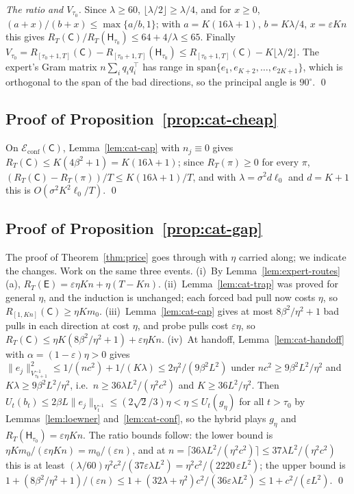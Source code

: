 \documentclass{article}
\theoremstyle{definition}
\theoremstyle{remark}
\newcommand{\eps}{\varepsilon}
\theoremstyle{remark}
\newcommand{\Cold}{\mathsf{C}}
\newcommand{\Exp}{\mathsf{E}}
\newcommand{\Hyb}{\mathsf{H}}
\begin{document}
\emph{The ratio and $V_{\tau_0}$.} Since $\lambda\ge60$, $\lfloor\lambda/2\rfloor\ge\lambda/4$,
and for $x\ge0$, $(a+x)/(b+x)\le\max\{a/b,1\}$; with $a=K(16\lambda+1)$,
$b=K\lambda/4$, $x=\eps Kn$ this gives $R_T(\Cold)/R_T(\Hyb_{\tau_0})\le64+4/\lambda\le65$.
Finally $V_{\tau_0}=R_{[\tau_0+1,T]}(\Cold)-R_{[\tau_0+1,T]}(\Hyb_{\tau_0})\le R_{[\tau_0+1,T]}(\Cold)-K\lfloor\lambda/2\rfloor$.
The expert's Gram matrix $n\sum_iq_iq_i^\top$ has range in
$\mathrm{span}\{e_1,e_{K+2},\dots,e_{2K+1}\}$, which is orthogonal to the span of
the bad directions, so the principal angle is $90^\circ$. \qed

\subsection{Proof of Proposition~\ref{prop:cat-cheap}}

On $\mathcal E_{\mathrm{conf}}(\Cold)$, Lemma~\ref{lem:cat-cap} with $n_j\equiv0$
gives $R_T(\Cold)\le K(4\beta^2+1)=K(16\lambda+1)$; since $R_T(\pi)\ge0$ for every
$\pi$, $(R_T(\Cold)-R_T(\pi))/T\le K(16\lambda+1)/T$, and with $\lambda=\sigma^2d\ell_0$
and $d=K+1$ this is $O(\sigma^2K^2\ell_0/T)$. \qed

\subsection{Proof of Proposition~\ref{prop:cat-gap}}

The proof of Theorem~\ref{thm:price} goes through with $\eta$ carried along;
we indicate the changes. Work on the same three events. (i)~By
Lemma~\ref{lem:expert-routes}(a), $R_T(\Exp)=\eps\eta Kn+\eta(T-Kn)$.
(ii)~Lemma~\ref{lem:cat-trap} was proved for general $\eta$, and the induction
is unchanged; each forced bad pull now costs $\eta$, so
$R_{[1,Kn]}(\Cold)\ge\eta Km_0$. (iii)~Lemma~\ref{lem:cat-cap} gives at most
$8\beta^2/\eta^2+1$ bad pulls in each direction at cost $\eta$, and probe pulls
cost $\eps\eta$, so $R_T(\Cold)\le\eta K(8\beta^2/\eta^2+1)+\eps\eta Kn$.
(iv)~At handoff, Lemma~\ref{lem:cat-handoff} with $\alpha=(1-\eps)\eta>0$ gives
$\|e_j\|^2_{V_{\tau_0+1}^{-1}}\le1/(nc^2)+1/(K\lambda)\le2\eta^2/(9\beta^2L^2)$ under
$nc^2\ge9\beta^2L^2/\eta^2$ and $K\lambda\ge9\beta^2L^2/\eta^2$, i.e.\ $n\ge36\lambda L^2/(\eta^2c^2)$
and $K\ge36L^2/\eta^2$. Then $U_t(b_t)\le2\beta L\|e_j\|_{V_t^{-1}}\le(2\sqrt2/3)\eta<\eta\le U_t(g_\eta)$
for all $t>\tau_0$ by Lemmas~\ref{lem:loewner} and~\ref{lem:cat-conf}, so the
hybrid plays $g_\eta$ and $R_T(\Hyb_{\tau_0})=\eps\eta Kn$. The ratio bounds
follow: the lower bound is $\eta Km_0/(\eps\eta Kn)=m_0/(\eps n)$, and at
$n=\lceil36\lambda L^2/(\eta^2c^2)\rceil\le37\lambda L^2/(\eta^2c^2)$ this is at least
$(\lambda/60)\eta^2c^2/(37\eps\lambda L^2)=\eta^2c^2/(2220\,\eps L^2)$; the upper bound
is $1+(8\beta^2/\eta^2+1)/(\eps n)\le1+(32\lambda+\eta^2)c^2/(36\eps\lambda L^2)\le1+c^2/(\eps L^2)$. \qed
\end{document}
